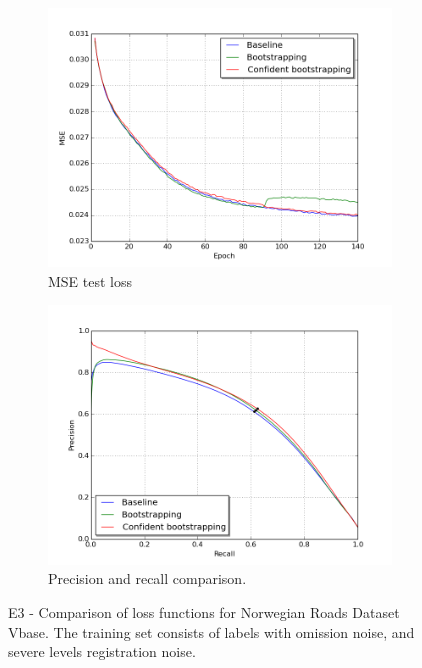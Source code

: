 \begin{figure}
\begin{subfigure}{0.48\textwidth}
\includegraphics[width=\linewidth]{figs/E3/E3_lc.png}
\caption{MSE test loss} \label{fig:E3_boot_norway_vbase_loss}
\end{subfigure}
\hspace*{\fill} %
\begin{subfigure}{0.48\textwidth}
\includegraphics[width=\linewidth]{figs/E3/E3_pr.png}
\caption{Precision and recall comparison.} \label{fig:E3_boot_norway_vbase_pr}
\end{subfigure}
\hspace*{\fill} %
\caption[E3 - Comparison of loss functions for Norwegian Roads Dataset Vbase]{E3 - Comparison of loss functions for Norwegian Roads Dataset Vbase. The training set consists of labels with omission noise, and severe levels registration noise.} \label{fig:E3_boot_norway_vbase}
\end{figure}

